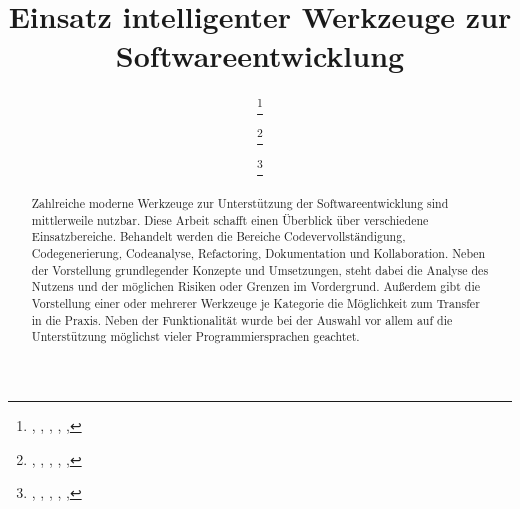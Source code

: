 




\title[Intelligente Werkzeuge SWE]{Einsatz intelligenter Werkzeuge zur Softwareentwicklung}
\author[Jonathan Schwab \and Felix Wochele \and Jonas Weis]
{
	\vornameEins \nachnameEins\footnote{\university, \abteilung, \strasse, \ort, \standortLand, \email{\mailEins}} \and
	\vornameZwei \nachnameZwei\footnote{\university, \abteilung, \strasse, \ort, \standortLand, \email{\mailZwei}} \and
	\vornameDrei \nachnameDrei\footnote{\university, \abteilung, \strasse, \ort, \standortLand, \email{\mailDrei}}
}
\editor{\herausgeber}    %
\booktitle{\konferenz} %
\maketitle

\begin{abstract}
Zahlreiche moderne Werkzeuge zur Unterstützung der Softwareentwicklung sind mittlerweile nutzbar. Diese Arbeit schafft einen Überblick über verschiedene Einsatzbereiche. Behandelt werden die Bereiche Codevervollständigung, Codegenerierung, Codeanalyse, Refactoring, Dokumentation und Kollaboration. Neben der Vorstellung grundlegender Konzepte und Umsetzungen, steht dabei die Analyse des Nutzens und der möglichen Risiken oder Grenzen im Vordergrund. Außerdem gibt die Vorstellung einer oder mehrerer Werkzeuge je Kategorie die Möglichkeit zum Transfer in die Praxis. Neben der Funktionalität wurde bei der Auswahl vor allem auf die Unterstützung möglichst vieler Programmiersprachen geachtet. 
\end{abstract}


\renewcommand{\lstlistingname}{Quellcode} %
\let\clearpage\relax









\printbibliography

